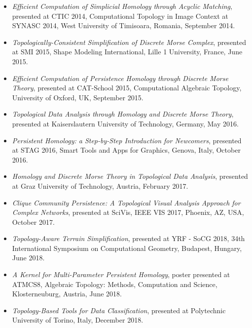 \documentclass[11pt]{article}
\begin{document}
\begin{itemize}

\item {\em Efficient Computation of Simplicial Homology through Acyclic Matching}, presented at CTIC 2014, Computational Topology in Image Context at SYNASC 2014, West University of Timisoara, Romania, September 2014.

\item {\em Topologically-Consistent Simplification of Discrete Morse Complex}, presented at SMI 2015, Shape Modeling International, Lille 1 University, France, June 2015.

\item {\em Efficient Computation of Persistence Homology through Discrete Morse Theory}, presented at CAT-School 2015, Computational Algebraic Topology, University of Oxford, UK, September 2015.

\item {\em Topological Data Analysis through Homology and Discrete Morse Theory}, presented at Kaiserslautern University of Technology, Germany, May 2016.

\item {\em Persistent Homology: a Step-by-Step Introduction for Newcomers}, presented at STAG 2016, Smart Tools and Apps for Graphics, Genova, Italy, October 2016.

\item {\em Homology and Discrete Morse Theory in Topological Data Analysis}, presented at Graz University of Technology, Austria, February 2017.

\item {\em Clique Community Persistence: A Topological Visual Analysis Approach for Complex Networks}, presented at SciVis, IEEE VIS 2017, Phoenix, AZ, USA, October 2017.

\item {\em Topology-Aware Terrain Simplification}, presented at YRF - SoCG 2018, 34th International Symposium on Computational Geometry, Budapest, Hungary, June 2018.

\item {\em A Kernel for Multi-Parameter Persistent Homology}, poster presented at ATMCS8, Algebraic Topology: Methods, Computation and Science, Klosterneuburg, Austria, June 2018.

\item {\em Topology-Based Tools for Data Classification}, presented at Polytechnic University of Torino, Italy, December 2018.


\end{itemize}
\end{document}
